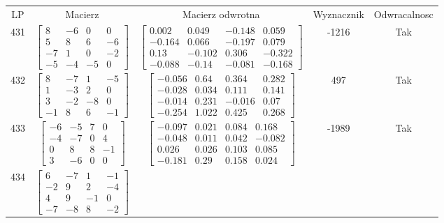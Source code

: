 \documentclass[a4paper,12pt]{article}
\begin{document}
\bgroup {} \vspace{0.2in} \begin{tabular}{c c c c c}
LP & Macierz & Macierz odwrotna & Wyznacznik & Odwracalnosc\\
431
&
$\begin{bmatrix} 8 & -6 & 0 & 0 \\ 5 & 8 & 6 & -6 \\ -7 & 1 & 0 & -2 \\ -5 & -4 & -5 & 0 \end{bmatrix}$
&
$\begin{bmatrix} 0.002 & 0.049 & -0.148 & 0.059 \\ -0.164 & 0.066 & -0.197 & 0.079 \\ 0.13 & -0.102 & 0.306 & -0.322 \\ -0.088 & -0.14 & -0.081 & -0.168 \end{bmatrix}$
&
-1216
&
Tak
\\
432
&
$\begin{bmatrix} 8 & -7 & 1 & -5 \\ 1 & -3 & 2 & 0 \\ 3 & -2 & -8 & 0 \\ -1 & 8 & 6 & -1 \end{bmatrix}$
&
$\begin{bmatrix} -0.056 & 0.64 & 0.364 & 0.282 \\ -0.028 & 0.034 & 0.111 & 0.141 \\ -0.014 & 0.231 & -0.016 & 0.07 \\ -0.254 & 1.022 & 0.425 & 0.268 \end{bmatrix}$
&
497
&
Tak
\\
433
&
$\begin{bmatrix} -6 & -5 & 7 & 0 \\ -4 & -7 & 0 & 4 \\ 0 & 8 & 8 & -1 \\ 3 & -6 & 0 & 0 \end{bmatrix}$
&
$\begin{bmatrix} -0.097 & 0.021 & 0.084 & 0.168 \\ -0.048 & 0.011 & 0.042 & -0.082 \\ 0.026 & 0.026 & 0.103 & 0.085 \\ -0.181 & 0.29 & 0.158 & 0.024 \end{bmatrix}$
&
-1989
&
Tak
\\
434
&
$\begin{bmatrix} 6 & -7 & 1 & -1 \\ -2 & 9 & 2 & -4 \\ 4 & 9 & -1 & 0 \\ -7 & -8 & 8 & -2 \end{bmatrix}$

\end{tabular}
\end{document}
